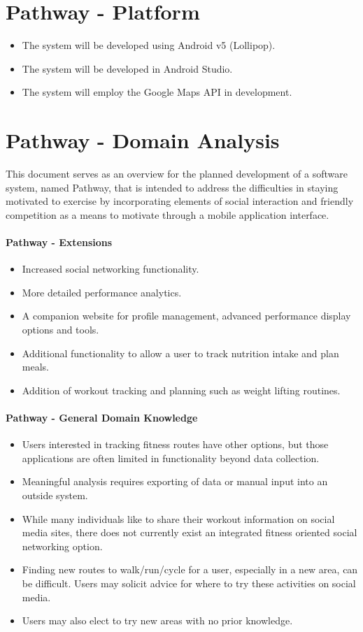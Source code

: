 \documentclass{article}
\begin{document}
\section{Pathway - Platform}
\begin{itemize}
    \item The system will be developed using Android v5 (Lollipop).
    \item The system will be developed in Android Studio.
    \item The system will employ the Google Maps API in development.
\end{itemize}

\section{Pathway - Domain Analysis}
This document serves as an overview for the planned development of a software system, named Pathway, that is intended to address the difficulties in staying motivated to exercise by incorporating elements of social interaction and friendly competition as a means to motivate through a mobile application interface.

\paragraph{Pathway - Extensions}
\begin{itemize}
    \item Increased social networking functionality.
    \item More detailed performance analytics.
    \item A companion website for profile management, advanced performance display options and tools.
    \item Additional functionality to allow a user to track nutrition intake and plan meals.
    \item Addition of workout tracking and planning such as weight lifting routines.
\end{itemize}

\paragraph{Pathway - General Domain Knowledge}
\begin{itemize}
    \item Users interested in tracking fitness routes have other options, but those applications are often limited in functionality beyond data collection.
    \item Meaningful analysis requires exporting of data or manual input into an outside system.
    \item While many individuals like to share their workout information on social media sites, there does not currently exist an integrated fitness oriented social networking option.
    \item Finding new routes to walk/run/cycle for a user, especially in a new area, can be difficult. Users may solicit advice for where to try these activities on social media.
    \item Users may also elect to try new areas with no prior knowledge.
\end{itemize}
\end{document}
